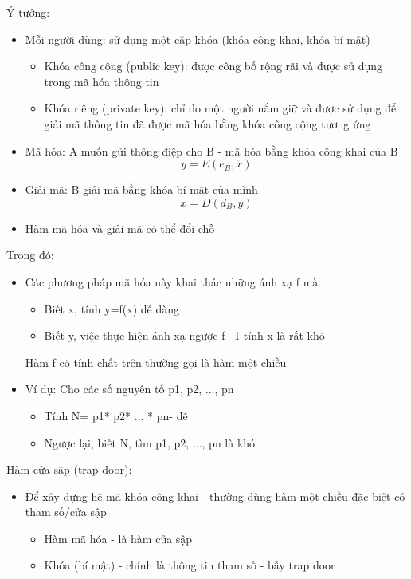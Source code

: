 \documentclass{article}
\begin{document}
Ý tưởng:
\begin{itemize}
\item Mỗi người dùng: sử dụng một cặp khóa (khóa công khai, khóa bí mật)
\begin{itemize}
\item Khóa công cộng (public key): được công bố rộng rãi và được sử dụng trong mã hóa thông tin
\item Khóa riêng (private key): chỉ do một người nắm giữ và được sử dụng để giải mã thông tin đã được mã hóa bằng khóa công cộng tương ứng
\end{itemize}

\item Mã hóa: A muốn gửi thông điệp cho B - mã hóa bằng khóa công khai của B
$$y = E(e_B, x)$$

\item Giải mã: B giải mã bằng khóa bí mật của mình
$$x = D(d_B, y)$$

\item Hàm mã hóa và giải mã có thể đổi chỗ
\end{itemize}

Trong đó:
\begin{itemize}
\item Các phương pháp mã hóa này khai thác những ánh xạ f mà
\begin{itemize}
\item Biết x, tính y=f(x) dễ dàng
\item Biết y, việc thực hiện ánh xạ ngược f –1 tính x là rất khó
\end{itemize}
Hàm f có tính chất trên thường gọi là hàm một chiều
\item Ví dụ: Cho các số nguyên tố p1, p2, ..., pn
\begin{itemize}
\item Tính N= p1* p2* ... * pn- dễ
\item Ngược lại, biết N, tìm p1, p2, ..., pn là khó
\end{itemize}
\end{itemize}

Hàm cửa sập (trap door):
\begin{itemize}
\item Để xây dựng hệ mã khóa công khai - thường dùng hàm một chiều đặc biệt có tham số/cửa sập
\begin{itemize}
\item Hàm mã hóa - là hàm cửa sập
\item Khóa (bí mật) - chính là thông tin tham số - bẫy trap door
\end{itemize}
\end{itemize}
\end{document}
